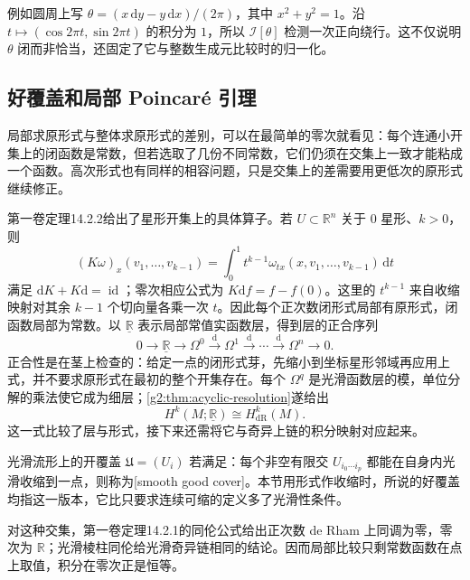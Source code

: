 例如圆周上写 \(\theta=(x\,\mathrm{d}y-y\,\mathrm{d}x)/(2\pi)\)，其中 \(x^2+y^2=1\)。沿 \(t\mapsto(\cos2\pi t,\sin2\pi t)\) 的积分为 \(1\)，所以 \(\mathcal I[\theta]\) 检测一次正向绕行。这不仅说明 \(\theta\) 闭而非恰当，还固定了它与整数生成元比较时的归一化。

\subsection{好覆盖和局部 Poincaré 引理}
\label{g2:subsec:0703:03}
局部求原形式与整体求原形式的差别，可以在最简单的零次就看见：每个连通小开集上的闭函数是常数，但若选取了几份不同常数，它们仍须在交集上一致才能粘成一个函数。高次形式也有同样的相容问题，只是交集上的差需要用更低次的原形式继续修正。

第一卷定理14.2.2给出了星形开集上的具体算子。若 \(U\subset\mathbb R^n\) 关于 \(0\) 星形、\(k>0\)，则
\[
	(K\omega)_x(v_1,\ldots,v_{k-1})
	=\int_0^1t^{k-1}\omega_{tx}(x,v_1,\ldots,v_{k-1})\,\mathrm{d}t
\]
满足 \(\mathrm{d}K+K\mathrm{d}=\operatorname{id}\)；零次相应公式为 \(K\mathrm{d}f=f-f(0)\)。这里的 \(t^{k-1}\) 来自收缩映射对其余 \(k-1\) 个切向量各乘一次 \(t\)。因此每个正次数闭形式局部有原形式，闭函数局部为常数。以 \(\underline{\mathbb R}\) 表示局部常值实函数层，得到层的正合序列
\begin{equation}\label{g2:eq:de-rham-resolution}
	0\longrightarrow\underline{\mathbb R}\longrightarrow\Omega^0
	\xrightarrow{\mathrm{d}}\Omega^1\xrightarrow{\mathrm{d}}\cdots
	\xrightarrow{\mathrm{d}}\Omega^n\longrightarrow0.
\end{equation}
正合性是在茎上检查的：给定一点的闭形式芽，先缩小到坐标星形邻域再应用上式，并不要求原形式在最初的整个开集存在。每个 \(\Omega^q\) 是光滑函数层的模，单位分解的乘法使它成为细层；\cref{g2:thm:acyclic-resolution}遂给出
\begin{equation}\label{g2:eq:de-rham-sheaf-comparison}
	H^k(M;\underline{\mathbb R})\cong H_{\mathrm{dR}}^k(M).
\end{equation}
这一式比较了层与形式，接下来还需将它与奇异上链的积分映射对应起来。

\begin{definition}[光滑好覆盖]\label{g2:def:good-cover}
	光滑流形上的开覆盖 \(\mathfrak U=(U_i)\) 若满足：每个非空有限交 \(U_{i_0\cdots i_p}\) 都能在自身内光滑收缩到一点，则称为[smooth good cover]。本节用形式作收缩时，所说的好覆盖均指这一版本，它比只要求连续可缩的定义多了光滑性条件。
\end{definition}

对这种交集，第一卷定理14.2.1的同伦公式给出正次数 de Rham 上同调为零，零次为 \(\mathbb R\)；光滑棱柱同伦给光滑奇异链相同的结论。因而局部比较只剩常数函数在点上取值，积分在零次正是恒等。


